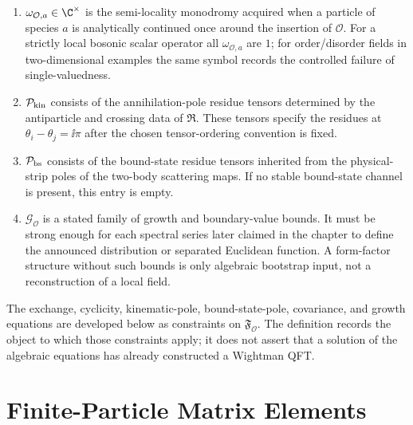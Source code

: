 \begin{definition}
\begin{enumerate}[label=\textnormal{(\roman*)}]
  argument; when adjacent rapidities are analytically continued around one
  another, the corresponding species spaces are reordered by the scattering
  maps of \(\mathfrak R\).
\item \(\omega_{\mathcal O,a}\in\C^\times\) is the semi-locality monodromy
  acquired when a particle of species \(a\) is analytically continued once
  around the insertion of \(\mathcal O\).  For a strictly local bosonic scalar
  operator all \(\omega_{\mathcal O,a}\) are \(1\); for order/disorder fields
  in two-dimensional examples the same symbol records the controlled failure
  of single-valuedness.
\item \(\mathcal P_{\rm kin}\) consists of the annihilation-pole residue
  tensors determined by the antiparticle and crossing data of
  \(\mathfrak R\).  These tensors specify the residues at
  \(\theta_i-\theta_j=\ii\pi\) after the chosen tensor-ordering convention is
  fixed.
\item \(\mathcal P_{\rm bs}\) consists of the bound-state residue tensors
  inherited from the physical-strip poles of the two-body scattering maps.
  If no stable bound-state channel is present, this entry is empty.
\item \(\mathcal G_{\mathcal O}\) is a stated family of growth and
  boundary-value bounds.  It must be strong enough for each spectral series
  later claimed in the chapter to define the announced distribution or
  separated Euclidean function.  A form-factor structure without such bounds is
  only algebraic bootstrap input, not a reconstruction of a local field.
\end{enumerate}
The exchange, cyclicity, kinematic-pole, bound-state-pole, covariance, and
growth equations are developed below as constraints on
\(\mathfrak F_{\mathcal O}\).  The definition records the object to which
those constraints apply; it does not assert that a solution of the algebraic
equations has already constructed a Wightman QFT.
\end{definition}

\section{Finite-Particle Matrix Elements}

